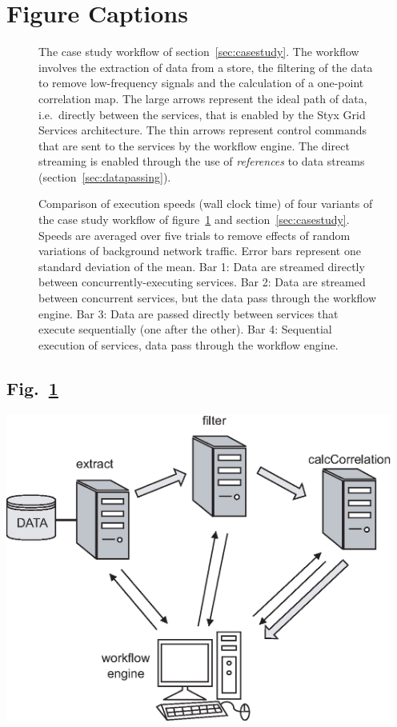 \documentclass[a4paper]{article}
\begin{document}
\section*{Figure Captions}

\begin{figure}[h]
\caption{The case study workflow of section~\ref{sec:casestudy}.  The workflow involves the extraction of data from a store, the filtering of the data to remove low-frequency signals and the calculation of a one-point correlation map.  The large arrows represent the ideal path of data, i.e.\ directly between the services, that is enabled by the Styx Grid Services architecture.  The thin arrows represent control commands that are sent to the services by the workflow engine.  The direct streaming is enabled through the use of \textit{references} to data streams (section~\ref{sec:datapassing}).}\label{fig:workflow}
\end{figure}

\begin{figure}[h]
\caption{Comparison of execution speeds (wall clock time) of four variants of the case study workflow of figure~\ref{fig:workflow} and section~\ref{sec:casestudy}.  Speeds are averaged over five trials to remove effects of random variations of background network traffic.  Error bars represent one standard deviation of the mean.  Bar 1: Data are streamed directly between concurrently-executing services.  Bar 2: Data are streamed between concurrent services, but the data pass through the workflow engine.  Bar 3: Data are passed directly between services that execute sequentially (one after the other).  Bar 4: Sequential execution of services, data pass through the workflow engine.}\label{fig:workflowspeeds}
\end{figure}

\newpage

\subsection*{Fig.~\ref{fig:workflow}}
\begin{center}
\includegraphics[width=5in]{workflow.eps}
\end{center}
\end{document}

